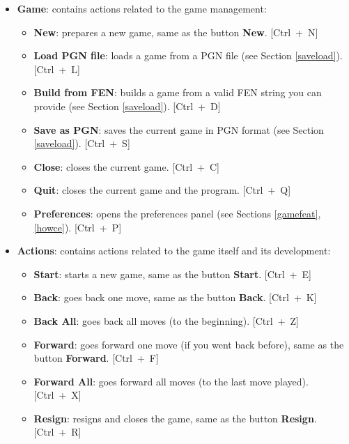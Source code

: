 \documentclass[a4paper]{article}
\begin{document}
\begin{itemize}
\item \textbf{Game}: contains actions related to the game management:
\begin{itemize}
\item \textbf{New}: prepares a new game, same as the button \textbf{New}. \mbox{[Ctrl + N]}
\item \textbf{Load PGN file}: loads a game from a PGN file (see Section \ref{saveload}). \mbox{[Ctrl + L]}
\item \textbf{Build from FEN}: builds a game from a valid FEN string you can provide (see Section \ref{saveload}). \mbox{[Ctrl + D]}
\item \textbf{Save as PGN}: saves the current game in PGN format (see Section \ref{saveload}). \mbox{[Ctrl + S]}
\item \textbf{Close}: closes the current game. \mbox{[Ctrl + C]}
\item \textbf{Quit}: closes the current game and the program. \mbox{[Ctrl + Q]}
\item \textbf{Preferences}: opens the preferences panel (see Sections \ref{gamefeat}, \ref{howce}). \mbox{[Ctrl + P]}
\end{itemize}

\item \textbf{Actions}: contains actions related to the game itself and its development:
\begin{itemize}
\item \textbf{Start}: starts a new game, same as the button \textbf{Start}. \mbox{[Ctrl + E]}
\item \textbf{Back}: goes back one move, same as the button \textbf{Back}. \mbox{[Ctrl + K]}
\item \textbf{Back All}: goes back all moves (to the beginning). \mbox{[Ctrl + Z]}
\item \textbf{Forward}: goes forward one move (if you went back before), same as the button \textbf{Forward}. \mbox{[Ctrl + F]}
\item \textbf{Forward All}: goes forward all moves (to the last move played). \mbox{[Ctrl + X]}
\item \textbf{Resign}: resigns and closes the game, same as the button \textbf{Resign}. \mbox{[Ctrl + R]}
\end{itemize}


\end{itemize}
\end{document}
